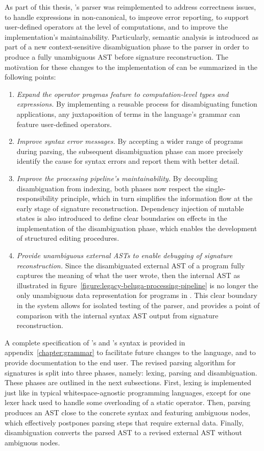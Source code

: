 As part of this thesis, \Beluga's parser was reimplemented to address correctness issues, to handle expressions in non-canonical, to improve error reporting, to support user-defined operators at the level of computations, and to improve the implementation's maintainability.
Particularly, semantic analysis is introduced as part of a new context-sensitive disambiguation phase to the parser in order to produce a fully unambiguous \ac{AST} before signature reconstruction.
The motivation for these changes to the implementation of \Beluga can be summarized in the following points:
\begin{enumerate}
\item
\textit{Expand the operator pragmas feature to computation-level types and expressions.}
By implementing a reusable process for disambiguating function applications, any juxtaposition of terms in the language's grammar can feature user-defined operators.
\item
\textit{Improve syntax error messages.}
By accepting a wider range of programs during parsing, the subsequent disambiguation phase can more precisely identify the cause for syntax errors and report them with better detail.
\item
\textit{Improve the processing pipeline's maintainability.}
By decoupling disambiguation from indexing, both phases now respect the single-responsibility principle, which in turn simplifies the information flow at the early stage of signature reconstruction.
Dependency injection of mutable states is also introduced to define clear boundaries on effects in the implementation of the disambiguation phase, which enables the development of structured editing procedures.
\item
\textit{Provide unambiguous external \acp{AST} to enable debugging of signature reconstruction.}
Since the disambiguated external \ac{AST} of a program fully captures the meaning of what the user wrote, then the internal \ac{AST} as illustrated in figure~\ref{figure:legacy-beluga-processing-pipeline} is no longer the only unambiguous data representation for programs in \Beluga.
This clear boundary in the system allows for isolated testing of the parser, and provides a point of comparison with the internal syntax \ac{AST} output from signature reconstruction.
\end{enumerate}

A complete specification of \Beluga's and \Harpoon's syntax is provided in appendix~\ref{chapter:grammar} to facilitate future changes to the language, and to provide documentation to the end user.
The revised parsing algorithm for \Beluga signatures is split into three phases, namely: lexing, parsing and disambiguation.
These phases are outlined in the next subsections.
First, lexing is implemented just like in typical whitespace-agnostic programming languages, except for one lexer hack used to handle some overloading of a static operator.
Then, parsing produces an \ac{AST} close to the concrete syntax and featuring ambiguous nodes, which effectively postpones parsing steps that require external data.
Finally, disambiguation converts the parsed \ac{AST} to a revised external \ac{AST} without ambiguous nodes.

